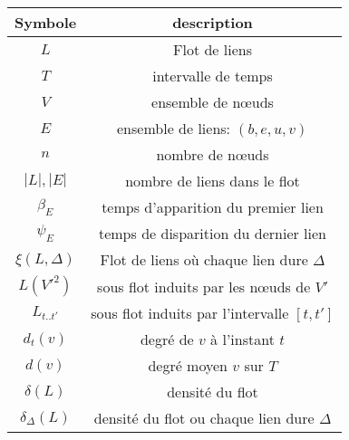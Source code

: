 \begin{center}
\begin{tabular}{|c|c|}
\hline Symbole & description \\
\hline $L$ & Flot de liens \\ 
$T$ & intervalle de temps  \\
$V$ & ensemble de n\oe uds\\
$E$ & ensemble de liens: $(b,e,u,v)$ \\
$n$ & nombre de n\oe uds  \\
$|L|,|E|$ & nombre de liens dans le flot \\
$\beta_E$ & temps d'apparition du premier lien\\
$\psi_E$ & temps de disparition du dernier lien\\
$\xi(L,\Delta)$ & Flot de liens où chaque lien dure $\Delta$\\
$L(V'^2)$ & sous flot induits par les n\oe uds de $V'$ \\
$L_{t..t'}$ & sous flot induits par l'intervalle $[t,t']$ \\
$d_t(v)$ & degré de $v$ à l'instant $t$\\
$d(v)$ & degré moyen $v$ sur $T$\\
$\delta(L)$ & densité du flot\\
$\delta_{\Delta}(L)$ & densité du flot ou chaque lien dure $\Delta$\\

\hline
\end{tabular} 
\end{center}

